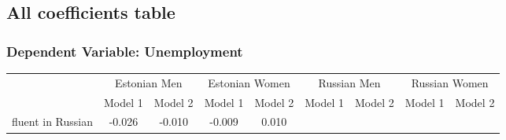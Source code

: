 \subsection{All coefficients table}

\subsubsection{Dependent Variable: Unemployment}
\label{sec:unemployment_full}
\begin{sidewaystable}
	

\begin{tabular}{l*{2}{c}| *{2}{c}| *{2}{c}| *{2}{c}}
			\toprule
	& \multicolumn{2}{c|}{Estonian Men} & \multicolumn{2}{c|}{Estonian Women} & \multicolumn{2}{c|}{Russian Men} & \multicolumn{2}{c}{Russian Women} \\ 

	
	&\multicolumn{1}{c}{Model 1}&\multicolumn{1}{c|}{Model 2}&\multicolumn{1}{c}{Model 1}&\multicolumn{1}{c|}{Model 2}&\multicolumn{1}{c}{Model 1}&\multicolumn{1}{c|}{Model 2}&\multicolumn{1}{c}{Model 1}&\multicolumn{1}{c}{Model 2}\\
	\midrule
	fluent in Russian   &      -0.026\sym{***}&      -0.010         &      -0.009         &       0.010\sym{*}  &                     &                     &                     &                     \\


\end{tabular}
\end{sidewaystable}
